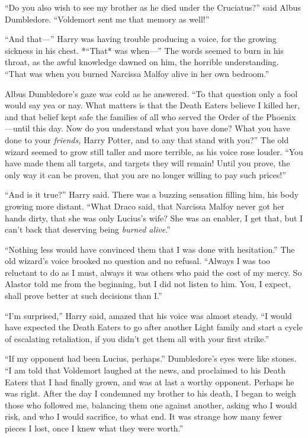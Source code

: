 ``Do you also wish to see my brother as he died under the Cruciatus?''
said Albus Dumbledore. ``Voldemort sent me that memory as well!''

``And that---'' Harry was having trouble producing a voice, for the
growing sickness in his chest. *``That* was when---'' The words seemed
to burn in his throat, as the awful knowledge dawned on him, the
horrible understanding. ``That was when you burned Narcissa Malfoy alive
in her own bedroom.''

Albus Dumbledore's gaze was cold as he answered. ``To that question only
a fool would say yea or nay. What matters is that the Death Eaters
believe I killed her, and that belief kept safe the families of all who
served the Order of the Phoenix---until this day. Now do you understand
what you have done? What you have done to your \emph{friends,} Harry
Potter, and to any that stand with you?'' The old wizard seemed to grow
still taller and more terrible, as his voice rose louder. ``You have
made them all targets, and targets they will remain! Until you prove,
the only way it can be proven, that you are no longer willing to pay
such prices!''

``And is it true?'' Harry said. There was a buzzing sensation filling
him, his body growing more distant. ``What Draco said, that Narcissa
Malfoy never got her hands dirty, that she was only Lucius's wife? She
was an enabler, I get that, but I can't back that deserving being
\emph{burned alive}.''

``Nothing less would have convinced them that I was done with
hesitation.'' The old wizard's voice brooked no question and no refusal.
``Always I was too reluctant to do as I must, always it was others who
paid the cost of my mercy. So Alastor told me from the beginning, but I
did not listen to him. You, I expect, shall prove better at such
decisions than I.''

``I'm surprised,'' Harry said, amazed that his voice was almost steady.
``I would have expected the Death Eaters to go after another Light
family and start a cycle of escalating retaliation, if you didn't get
them all with your first strike.''

``If my opponent had been Lucius, perhaps.'' Dumbledore's eyes were like
stones. ``I am told that Voldemort laughed at the news, and proclaimed
to his Death Eaters that I had finally grown, and was at last a worthy
opponent. Perhaps he was right. After the day I condemned my brother to
his death, I began to weigh those who followed me, balancing them one
against another, asking who I would risk, and who I would sacrifice, to
what end. It was strange how many fewer pieces I lost, once I knew what
they were worth.''

